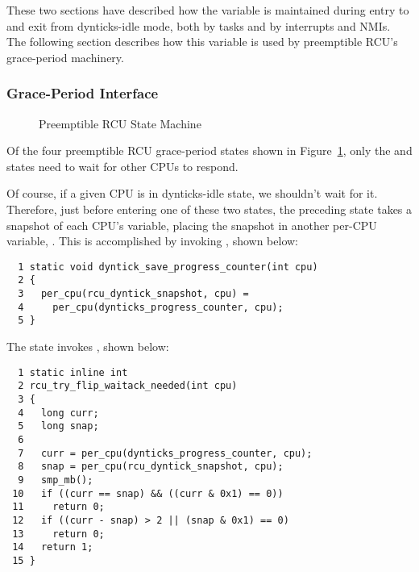 These two sections have described how the
 variable is maintained during
entry to and exit from dynticks-idle mode, both by tasks and by
interrupts and NMIs.
The following section describes how this variable is used by
preemptible RCU's grace-period machinery.

\subsubsection{Grace-Period Interface}
\label{sec:formal:Grace-Period Interface}

\begin{figure}[htb]
\centering
{}
\caption{Preemptible RCU State Machine}
\label{fig:formal:Preemptible RCU State Machine}
\end{figure}

Of the four preemptible RCU grace-period states shown in
Figure~\ref{fig:formal:Preemptible RCU State Machine},
only the 
and  states need to wait
for other CPUs to respond.

Of course, if a given CPU is in dynticks-idle state, we shouldn't
wait for it.
Therefore, just before entering one of these two states,
the preceding state takes a snapshot of each CPU's
 variable, placing the
snapshot in another per-CPU variable,
.
This is accomplished by invoking
, shown below:

{ \scriptsize
\begin{verbatim}
  1 static void dyntick_save_progress_counter(int cpu)
  2 {
  3   per_cpu(rcu_dyntick_snapshot, cpu) =
  4     per_cpu(dynticks_progress_counter, cpu);
  5 }
\end{verbatim}
}

The  state invokes
, shown below:

{ \scriptsize
\begin{verbatim}
  1 static inline int
  2 rcu_try_flip_waitack_needed(int cpu)
  3 {
  4   long curr;
  5   long snap;
  6
  7   curr = per_cpu(dynticks_progress_counter, cpu);
  8   snap = per_cpu(rcu_dyntick_snapshot, cpu);
  9   smp_mb();
 10   if ((curr == snap) && ((curr & 0x1) == 0))
 11     return 0;
 12   if ((curr - snap) > 2 || (snap & 0x1) == 0)
 13     return 0;
 14   return 1;
 15 }
\end{verbatim}
}

